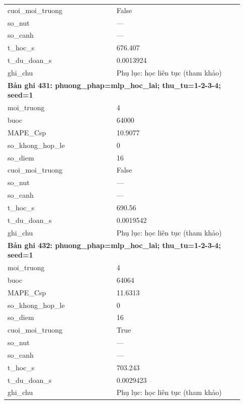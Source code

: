 \begin{longtable}{p{0.43\linewidth}p{0.50\linewidth}}
cuoi\_\allowbreak moi\_\allowbreak truong & False \\
so\_\allowbreak nut & — \\
so\_\allowbreak canh & — \\
t\_\allowbreak hoc\_\allowbreak s & 676.407 \\
t\_\allowbreak du\_\allowbreak doan\_\allowbreak s & 0.0013924 \\
ghi\_\allowbreak chu & Phụ lục: học liên tục (tham khảo) \\
\midrule
\multicolumn{2}{p{0.95\linewidth}}{\textbf{Bản ghi 431: phuong\_phap=mlp\_hoc\_lai; thu\_tu=1-2-3-4; seed=1}} \\
moi\_\allowbreak truong & 4 \\
buoc & 64000 \\
MAPE\_\allowbreak Csp & 10.9077 \\
so\_\allowbreak khong\_\allowbreak hop\_\allowbreak le & 0 \\
so\_\allowbreak diem & 16 \\
cuoi\_\allowbreak moi\_\allowbreak truong & False \\
so\_\allowbreak nut & — \\
so\_\allowbreak canh & — \\
t\_\allowbreak hoc\_\allowbreak s & 690.56 \\
t\_\allowbreak du\_\allowbreak doan\_\allowbreak s & 0.0019542 \\
ghi\_\allowbreak chu & Phụ lục: học liên tục (tham khảo) \\
\midrule
\multicolumn{2}{p{0.95\linewidth}}{\textbf{Bản ghi 432: phuong\_phap=mlp\_hoc\_lai; thu\_tu=1-2-3-4; seed=1}} \\
moi\_\allowbreak truong & 4 \\
buoc & 64064 \\
MAPE\_\allowbreak Csp & 11.6313 \\
so\_\allowbreak khong\_\allowbreak hop\_\allowbreak le & 0 \\
so\_\allowbreak diem & 16 \\
cuoi\_\allowbreak moi\_\allowbreak truong & True \\
so\_\allowbreak nut & — \\
so\_\allowbreak canh & — \\
t\_\allowbreak hoc\_\allowbreak s & 703.243 \\
t\_\allowbreak du\_\allowbreak doan\_\allowbreak s & 0.0029423 \\
ghi\_\allowbreak chu & Phụ lục: học liên tục (tham khảo) \\

\end{longtable}
